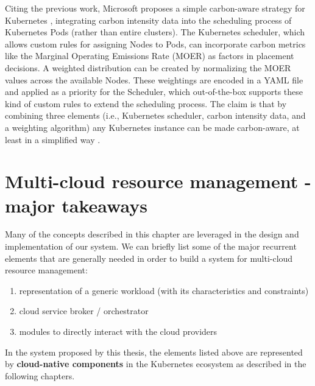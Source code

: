 Citing the previous work, Microsoft proposes a simple carbon-aware strategy for Kubernetes \cite{microsoft_carbon_aware_k8s}, integrating carbon intensity data into the scheduling process of Kubernetes Pods (rather than entire clusters).
The Kubernetes scheduler, which allows custom rules for assigning Nodes to Pods, can incorporate carbon metrics like the Marginal Operating Emissions Rate (MOER) as factors in placement decisions. 
A weighted distribution can be created by normalizing the MOER values across the available Nodes.
These weightings are encoded in a YAML file and applied as a priority for the Scheduler, which out-of-the-box supports these kind of custom rules to extend the scheduling process.
The claim is that by combining three elements (i.e., Kubernetes scheduler, carbon intensity data, and a weighting algorithm) any Kubernetes instance can be made carbon-aware, at least in a simplified way \cite{microsoft_carbon_aware_k8s}.

\section{Multi-cloud resource management - major takeaways}
\label{sec:multi_cloud_resource_management_takeaways}

Many of the concepts described in this chapter are leveraged in the design and implementation of our system. 
We can briefly list some of the major recurrent elements that are generally needed in order to build a system for multi-cloud resource management:
\begin{enumerate}
    \item representation of a generic workload (with its characteristics and constraints)
    \item cloud service broker / orchestrator
    \item modules to directly interact with the cloud providers
\end{enumerate}

In the system proposed by this thesis, the elements listed above are represented by \textbf{cloud-native components} in the Kubernetes ecosystem as described in the following chapters.

\newpage
